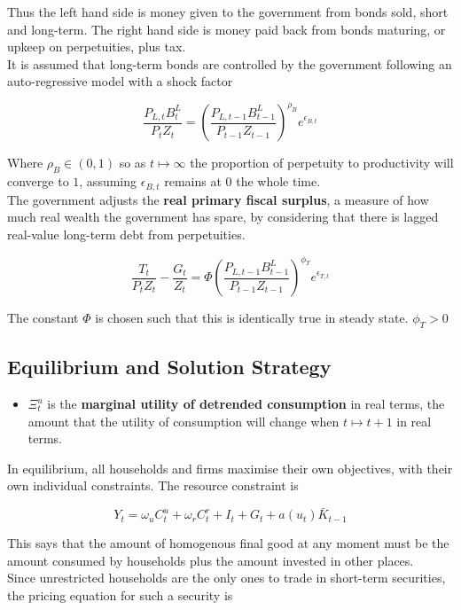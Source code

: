 \documentclass[notitlepage,12pt]{report}
\begin{document}
\begin{appendices}
	Thus the left hand side is money given to the government from bonds sold, short and long-term. The right hand side is money paid back from bonds maturing, or upkeep on perpetuities, plus tax.\\
	It is assumed that long-term bonds are controlled by the government following an auto-regressive model with a shock factor
	
	\begin{equation}
	\frac{P_{L,t}B_t^L}{P_tZ_t}=\left(\frac{P_{L,t-1}B_{t-1}^L}{P_{t-1}Z_{t-1}}\right)^{\rho_B}e^{\epsilon_{B,t}}
	\end{equation}
	
	Where \(\rho_B\in(0,1)\) so as \(t\mapsto\infty\) the proportion of perpetuity to productivity will converge to \(1\), assuming \(\epsilon_{B,t}\) remains at \(0\) the whole time.\\
	The government adjusts the {\bf real primary fiscal surplus}, a measure of how much real wealth the government has spare, by considering that there is lagged real-value long-term debt from perpetuities.
	
	\begin{equation}
	\frac{T_t}{P_tZ_t}-\frac{G_t}{Z_t}=\Phi\left(\frac{P_{L,t-1}B_{t-1}^L}{P_{t-1}Z_{t-1}}\right)^{\phi_T}e^{\epsilon_{T,t}}
	\end{equation}
	
	The constant \(\Phi\) is chosen such that this is identically true in steady state. \(\phi_T>0\)
	
	\subsection{Equilibrium and Solution Strategy}
	
	\begin{itemize}
		\item \(\Xi_t^u\) is the {\bf marginal utility of detrended consumption} in real terms, the amount that the utility of consumption will change when \(t\mapsto t+1\) in real terms.
	\end{itemize}
	
	In equilibrium, all households and firms maximise their own objectives, with their own individual constraints. The resource constraint is
	
	\begin{equation}
	Y_t=\omega_uC_t^u+\omega_rC_t^r+I_t+G_t+a(u_t)\bar{K}_{t-1}
	\end{equation}
	
	This says that the amount of homogenous final good at any moment must be the amount consumed by households plus the amount invested in other places.\\
	Since unrestricted households are the only ones to trade in short-term securities, the pricing equation for such a security is
	

\end{appendices}
\end{document}
